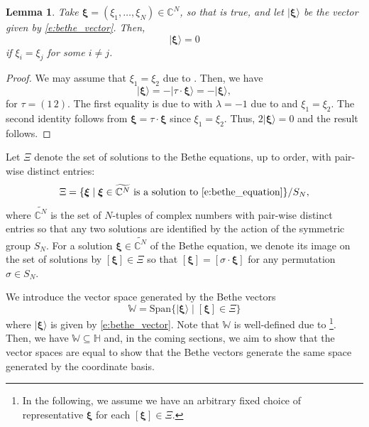 \documentclass[a4paper,11pt]{article}
\newtheorem{lemma}[theorem]{Lemma}
\theoremstyle{definition}
\begin{document}
\begin{lemma}
    Take $\boldsymbol{\xi} = (\xi_1, \dots, \xi_N) \in \mathbb{C}^N$, so that  is true, and let $|\boldsymbol{\xi} \rangle$ be the vector given by \eqref{e:bethe_vector}. Then,
    \begin{equation}
        |\boldsymbol{\xi} \rangle = 0
    \end{equation}
    if $\xi_i = \xi_j$ for some $i \neq j$.
\end{lemma}

\begin{proof}
    We may assume that $\xi_1 = \xi_{2}$ due to . Then, we have
    \begin{equation}
        |\boldsymbol{\xi} \rangle = - | \tau \cdot \boldsymbol{\xi} \rangle = - | \boldsymbol{\xi} \rangle,
    \end{equation}
    for $\tau = (1\, 2)$. The first equality is due to  with $\lambda = -1$ due to  and $\xi_1 = \xi_2$. The second identity follows from $\boldsymbol{\xi} = \tau \cdot \boldsymbol{\xi}$ since $\xi_1 = \xi_2$. Thus, $2 |\boldsymbol{\xi} \rangle =0$ and the result follows.
\end{proof}


Let $\Xi$ denote the set of solutions to the Bethe equations, up to order, with pair-wise distinct entries:
\begin{equation}\label{e:bethe_sols}
    \Xi = \{ \boldsymbol{\xi}  \mid \boldsymbol{\xi}\in \widetilde{\mathbb{C}^N} \text{ is a solution to \eqref{e:bethe_equation}}\}/ S_N,
\end{equation}
where $\widetilde{\mathbb{C}^N}$ is the set of $N$-tuples of complex numbers with pair-wise distinct entries so that any two solutions are identified by the action of the symmetric group $S_N$. For a solution $\boldsymbol{\xi} \in \widetilde{\mathbb{C}^N}$ of the Bethe equation, we denote its image on the set of solutions by $[\boldsymbol{\xi}] \in \Xi$ so that $[\boldsymbol{\xi}] = [\sigma \cdot \boldsymbol{\xi}]$ for any permutation $\sigma \in S_N$. 



We introduce the vector space generated by the Bethe vectors
\begin{equation}\label{e:bethe_space}
    \mathbb{W} = \mathrm{Span}\{ | \boldsymbol{\xi} \rangle \mid [\boldsymbol{\xi}] \in\Xi\}
\end{equation}
where $|\boldsymbol{\xi} \rangle$ is given by \eqref{e:bethe_vector}. Note that $\mathbb{W}$ is well-defined due to \footnote{In the following, we assume we have an arbitrary fixed choice of representative $\boldsymbol{\xi}$ for each $[\boldsymbol{\xi}] \in \Xi$.}. Then, we have $\mathbb{W} \subseteq \mathbb{H}$ and, in the coming sections, we aim to show that the vector spaces are equal to show that the Bethe vectors generate the same space generated by the coordinate basis.
\end{document}
